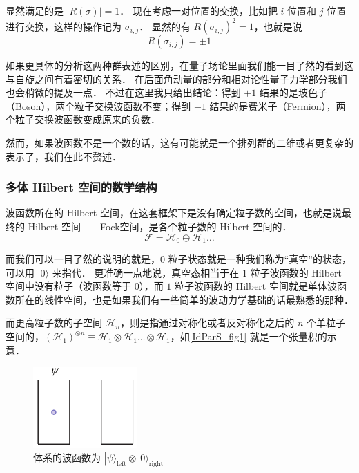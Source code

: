 显然满足的是 $|R(\sigma)| = 1$． 现在考虑一对位置的交换，比如把 $i$ 位置和 $j$ 位置进行交换，这样的操作记为 $\sigma_{i,j}$． 显然的有 $R(\sigma_{i,j})^2 = 1$，也就是说
\begin{equation}
R(\sigma_{i,j}) = \pm 1
\end{equation}

如果更具体的分析这两种群表述的区别，在量子场论里面我们能一目了然的看到这与自旋之间有着密切的关系． 在后面角动量的部分和相对论性量子力学部分我们也会稍微的提及一点． 不过在这里我只给出结论：得到 $+1$ 结果的是玻色子（Boson），两个粒子交换波函数不变；得到 $-1$ 结果的是费米子（Fermion），两个粒子交换波函数变成原来的负数．

然而，如果波函数不是一个数的话，这有可能就是一个排列群的二维或者更复杂的表示了，我们在此不赘述．

\subsubsection{多体 Hilbert 空间的数学结构}

波函数所在的 Hilbert 空间，在这套框架下是没有确定粒子数的空间，也就是说最终的 Hilbert 空间——Fock空间，是各个粒子数的 Hilbert 空间的．
\begin{equation}
\mathcal{F} = \mathcal{H}_0 \oplus \mathcal{H}_1\dots
\end{equation}

而我们可以一目了然的说明的就是，$0$ 粒子状态就是一种我们称为“真空”的状态，可以用 $|0\rangle$ 来指代． 更准确一点地说，真空态相当于在 $1$ 粒子波函数的 Hilbert 空间中没有粒子（波函数等于 $0$），而 $1$ 粒子波函数的 Hilbert 空间就是单体波函数所在的线性空间，也是如果我们有一些简单的波动力学基础的话最熟悉的那种．

而更高粒子数的子空间 $\mathcal{H}_n$，则是指通过对称化或者反对称化之后的 $n$ 个单粒子空间的，$(\mathcal{H}_1)^{\otimes n} \equiv \mathcal{H}_1\otimes \mathcal{H}_1\dots\otimes\mathcal{H}_1$，如\autoref{IdParS_fig1} 就是一个张量积的示意．

\begin{figure}[ht]
\centering
\includegraphics[width=4cm]{./figures/IdParS1.pdf}
\caption{体系的波函数为 $|\psi\rangle_\text{left}\otimes|0\rangle_\text{right}$} \label{IdParS_fig1}
\end{figure}

